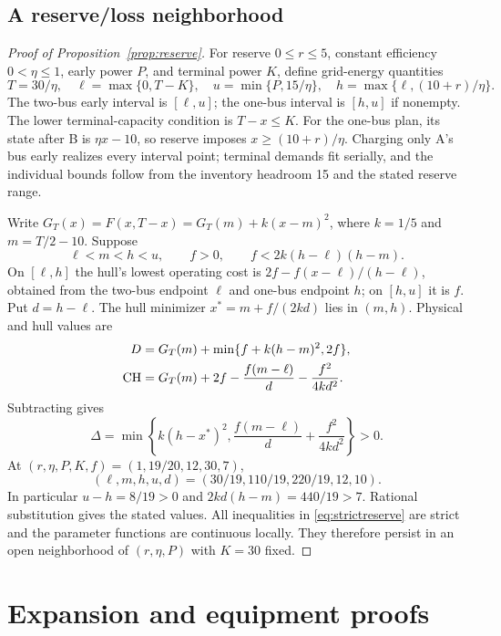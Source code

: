 \subsection{A reserve/loss neighborhood}\label{app:reserve}
\begin{proof}[Proof of Proposition~\ref{prop:reserve}]
For reserve $0\le r\le5$, constant efficiency $0<\eta\le1$, early
power $P$, and terminal power $K$, define grid-energy quantities
\[
 T=30/\eta,\quad \ell=\max\{0,T-K\},\quad
 u=\min\{P,15/\eta\},\quad
 h=\max\{\ell,(10+r)/\eta\}.
\]
The two-bus early interval is $[\ell,u]$; the one-bus interval is
$[h,u]$ if nonempty. The lower terminal-capacity condition is
$T-x\le K$. For the one-bus plan, its state after B is $\eta x-10$,
so reserve imposes $x\ge(10+r)/\eta$. Charging only A's bus early
realizes every interval point; terminal demands fit serially, and the
individual bounds follow from the inventory headroom 15 and the stated
reserve range.

Write $G_T(x)=F(x,T-x)=G_T(m)+k(x-m)^2$, where $k=1/5$ and
$m=T/2-10$. Suppose
\begin{equation}\label{eq:strictreserve}
 \ell<m<h<u,\qquad f>0,\qquad f<2k(h-\ell)(h-m).
\end{equation}
On $[\ell,h]$ the hull's lowest operating cost is
$2f-f(x-\ell)/(h-\ell)$, obtained from the two-bus endpoint $\ell$
and one-bus endpoint $h$; on $[h,u]$ it is $f$. Put $d=h-\ell$.
The hull minimizer $x^*=m+f/(2kd)$ lies in $(m,h)$. Physical and hull
values are
\begin{align*}
 D&=G_T(m)+\min\{f+k(h-m)^2,2f\},\\
 \mathrm{CH}&=G_T(m)+2f-\frac{f(m-\ell)}d-\frac{f^2}{4kd^2}.
\end{align*}
Subtracting gives
\[
 \Delta=\min\left\{k(h-x^*)^2,
 \frac{f(m-\ell)}d+\frac{f^2}{4kd^2}\right\}>0.
\]
At $(r,\eta,P,K,f)=(1,19/20,12,30,7)$,
\[
 (\ell,m,h,u,d)=(30/19,110/19,220/19,12,10).
\]
In particular $u-h=8/19>0$ and $2kd(h-m)=440/19>7$.
Rational substitution gives the stated values. All inequalities in
\eqref{eq:strictreserve} are strict and the parameter functions are
continuous locally. They therefore persist in an open neighborhood of
$(r,\eta,P)$ with $K=30$ fixed.
\end{proof}

\section{Expansion and equipment proofs}
